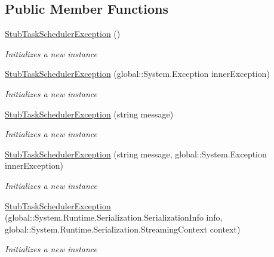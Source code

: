 \subsection*{Public Member Functions}
\begin{DoxyCompactItemize}
\item 
\hyperlink{class_system_1_1_threading_1_1_tasks_1_1_fakes_1_1_stub_task_scheduler_exception_aa9a5b8078fd2c7875d9dca973d152c0b}{Stub\-Task\-Scheduler\-Exception} ()
\begin{DoxyCompactList}\small\item\em Initializes a new instance\end{DoxyCompactList}\item 
\hyperlink{class_system_1_1_threading_1_1_tasks_1_1_fakes_1_1_stub_task_scheduler_exception_a080acd52c4e15e5c8f167c970571782a}{Stub\-Task\-Scheduler\-Exception} (global\-::\-System.\-Exception inner\-Exception)
\begin{DoxyCompactList}\small\item\em Initializes a new instance\end{DoxyCompactList}\item 
\hyperlink{class_system_1_1_threading_1_1_tasks_1_1_fakes_1_1_stub_task_scheduler_exception_a8fc3029654384ec028e1099720820533}{Stub\-Task\-Scheduler\-Exception} (string message)
\begin{DoxyCompactList}\small\item\em Initializes a new instance\end{DoxyCompactList}\item 
\hyperlink{class_system_1_1_threading_1_1_tasks_1_1_fakes_1_1_stub_task_scheduler_exception_aae756ecfbc14af738b0e6492614505b1}{Stub\-Task\-Scheduler\-Exception} (string message, global\-::\-System.\-Exception inner\-Exception)
\begin{DoxyCompactList}\small\item\em Initializes a new instance\end{DoxyCompactList}\item 
\hyperlink{class_system_1_1_threading_1_1_tasks_1_1_fakes_1_1_stub_task_scheduler_exception_aeb20f746e7899fd13eee310cd714fc17}{Stub\-Task\-Scheduler\-Exception} (global\-::\-System.\-Runtime.\-Serialization.\-Serialization\-Info info, global\-::\-System.\-Runtime.\-Serialization.\-Streaming\-Context context)
\begin{DoxyCompactList}\small\item\em Initializes a new instance\end{DoxyCompactList}\item 

\end{DoxyCompactItemize}
